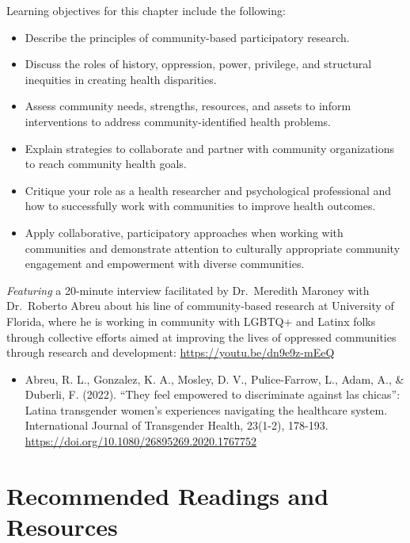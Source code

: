 \documentclass[
  11pt,
]{book}
\providecommand{\tightlist}{%
  \setlength{\itemsep}{0pt}\setlength{\parskip}{0pt}}
\begin{document}
Learning objectives for this chapter include the following:

\begin{itemize}
\tightlist
\item
  Describe the principles of community-based participatory research.
\item
  Discuss the roles of history, oppression, power, privilege, and structural inequities in creating health disparities.
\item
  Assess community needs, strengths, resources, and assets to inform interventions to address community-identified health problems.
\item
  Explain strategies to collaborate and partner with community organizations to reach community health goals.
\item
  Critique your role as a health researcher and psychological professional and how to successfully work with communities to improve health outcomes.
\item
  Apply collaborative, participatory approaches when working with communities and demonstrate attention to culturally appropriate community engagement and empowerment with diverse communities.
\end{itemize}

\emph{Featuring} a 20-minute interview facilitated by Dr.~Meredith Maroney with Dr.~Roberto Abreu about his line of community-based research at University of Florida, where he is working in community with LGBTQ+ and Latinx folks through collective efforts aimed at improving the lives of oppressed communities through research and development: \url{https://youtu.be/dn9e9z-mEeQ}

\begin{itemize}
\tightlist
\item
  Abreu, R. L., Gonzalez, K. A., Mosley, D. V., Pulice-Farrow, L., Adam, A., \& Duberli, F. (2022). ``They feel empowered to discriminate against las chicas'': Latina transgender women's experiences navigating the healthcare system. International Journal of Transgender Health, 23(1-2), 178-193. \url{https://doi.org/10.1080/26895269.2020.1767752}
\end{itemize}

\hypertarget{recommended-readings-and-resources}{%
\section{Recommended Readings and Resources}\label{recommended-readings-and-resources}}
\end{document}
